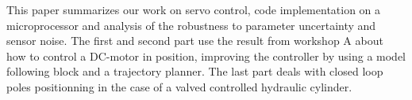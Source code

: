 This paper summarizes our work on servo control, code implementation on a microprocessor and analysis of the robustness to parameter uncertainty and sensor noise. The first and second part use the result from workshop A about how to control a DC-motor in position, improving the controller by using a model following block and a trajectory planner. The last part deals with closed loop poles positionning in the case of a valved controlled hydraulic cylinder.